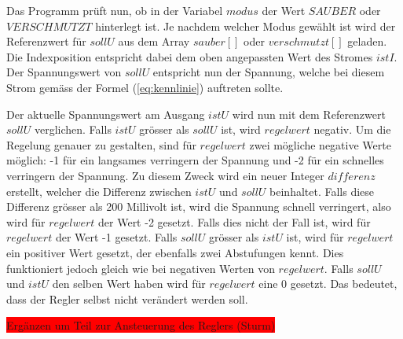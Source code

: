 Das Programm prüft nun, ob in der Variabel $modus$ der Wert $SAUBER$ oder $VERSCHMUTZT$ hinterlegt ist. Je nachdem welcher Modus gewählt ist wird der Referenzwert für $sollU$ aus dem Array $sauber[]$ oder $verschmutzt[]$ geladen. Die Indexposition entspricht dabei dem oben angepassten Wert des Stromes $istI$. Der Spannungswert von $sollU$ entspricht nun der Spannung, welche bei diesem Strom gemäss der Formel (\ref{eq:kennlinie}) auftreten sollte.

Der aktuelle Spannungswert am Ausgang $istU$ wird nun mit dem Referenzwert $sollU$ verglichen. Falls $istU$ grösser als $sollU$ ist, wird $regelwert$ negativ. Um die Regelung genauer zu gestalten, sind für $regelwert$ zwei mögliche negative Werte möglich: -1 für ein langsames verringern der Spannung und -2 für ein schnelles verringern der Spannung. Zu diesem Zweck wird ein neuer Integer $differenz$ erstellt, welcher die Differenz zwischen $istU$ und $sollU$ beinhaltet. Falls diese Differenz grösser als 200 Millivolt ist, wird die Spannung schnell verringert, also wird für $regelwert$ der Wert -2 gesetzt. Falls dies nicht der Fall ist, wird für $regelwert$ der Wert -1 gesetzt. \newline
Falls $sollU$ grösser als $istU$ ist, wird für $regelwert$ ein positiver Wert gesetzt, der ebenfalls zwei Abstufungen kennt. Dies funktioniert jedoch gleich wie bei negativen Werten von $regelwert$. \newline
Falls $sollU$ und $istU$ den selben Wert haben wird für $regelwert$ eine 0 gesetzt. Das bedeutet, dass der Regler selbst nicht verändert werden soll.

\colorbox{red}{Ergänzen um Teil zur Ansteuerung des Reglers (Sturm)}




%
%
